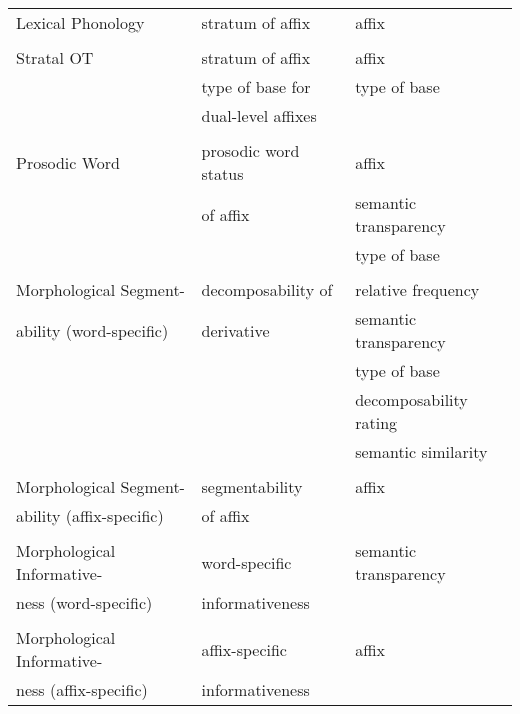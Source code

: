 {\begin{table*}[b!]
\begin{center}
\begin{tabularx}{\textwidth}{lll}
			Lexical Phonology 									& stratum of affix &affix\\ 
			\\
			Stratal OT 													& stratum of affix& affix\\ 
			&type of base for & type of base\\ 
			&dual-level affixes& \\ 
			\\
			Prosodic Word										 & prosodic word status & affix \\ 
			& 						of affix								&  semantic transparency\\ 
			& 														& type of base \\ 
			\\
			Morphological Segment- &decomposability of &  relative frequency \\ 
			ability (word-specific)															& 	derivative 													& semantic transparency \\
			&														& type of base \\
			&														& decomposability rating\\
			&														& semantic similarity\\
			
			\\															
			Morphological Segment-&segmentability &   affix\\	
			ability (affix-specific) &of affix	& \\																	
			\\
			Morphological Informative-& word-specific  & semantic transparency\\
			ness (word-specific) &informativeness& \\																	 
			\\
			Morphological Informative- & affix-specific &  affix \\
			ness (affix-specific) &informativeness& \\																	 
			

			\midrule
			

		\end{tabularx}
	\end{center}

\end{table*}




}
